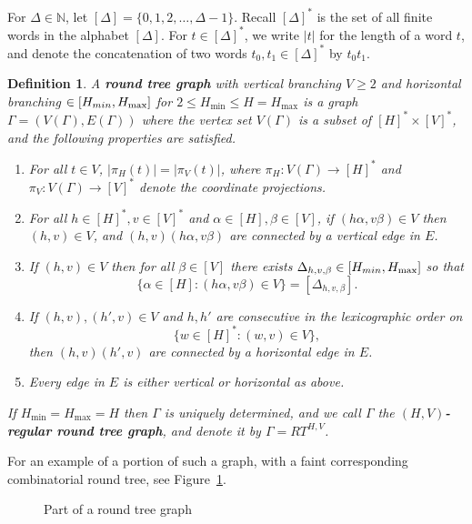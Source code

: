 \documentclass[11pt]{amsart}
\numberwithin{equation}{section}
\newtheorem{definition}[equation]{Definition}
\theoremstyle{citing}
\newcommand{\N}{\mathbb{N}}
\numberwithin{equation}{section}
\begin{document}
For $\Delta \in \N$, let $[\Delta] = \{0,1,2,\ldots,\Delta-1\}$.
Recall $[\Delta]^*$ is the set of all finite words in the alphabet $[\Delta]$.
For $t \in [\Delta]^*$, we write $|t|$ for the length of a word $t$, and denote the concatenation of two words $t_0,t_1 \in [\Delta]^*$ by $t_0t_1$.
\begin{definition}
	\label{def:round-tree-graph}
	A \textbf{round tree graph} with vertical branching $V \geq 2$ and horizontal branching $\in [H_{\\min},H_{\max}]$ for $2 \leq H_{\min} \leq H=H_{\max}$ is a graph $\Gamma=(V(\Gamma),E(\Gamma))$ where the vertex set $V(\Gamma)$ is a subset of $[H]^* \times [V]^*$, and the following properties are satisfied. 
	\begin{enumerate}
		\item For all $t \in V$, $|\pi_H(t)|=|\pi_V(t)|$, where $\pi_H:V(\Gamma) \to [H]^*$ and $\pi_V:V(\Gamma) \to [V]^*$ denote the coordinate projections.
		\item For all $h \in [H]^*, v \in [V]^*$ and $\alpha \in [H], \beta \in [V]$, if $(h\alpha,v\beta) \in V$ then $(h,v) \in V$, and $(h,v)(h\alpha,v\beta)$ are connected by a \emph{vertical} edge in $E$.
		\item If $(h,v) \in V$ then for all $\beta \in [V]$ there exists $\Delta_{h,v,\beta} \in [H_{\\min},H_{\max}]$ so that
			\[
				\{\alpha \in [H] : (h\alpha, v\beta) \in V\} = [\Delta_{h,v,\beta}].
			\]
		\item If $(h,v),(h',v) \in V$ and $h,h'$ are consecutive in the lexicographic order on
			\[ \{ w \in [H]^* : (w,v) \in V \}, \]
			then $(h,v)(h',v)$ are connected by a \emph{horizontal} edge in $E$.
		\item Every edge in $E$ is either vertical or horizontal as above.
	\end{enumerate}
	If $H_{\min}=H_{\max}=H$ then $\Gamma$ is uniquely determined, and we call $\Gamma$ the \textbf{$(H,V)$-regular round tree graph}, and denote it by $\Gamma=RT^{H,V}$.
\end{definition}
For an example of a portion of such a graph, with a faint corresponding combinatorial round tree, see Figure~\ref{fig:rtgraph}.
\begin{figure}
   \def\svgwidth{.8\textwidth}
   
	\caption{Part of a round tree graph}	
	\label{fig:rtgraph}
\end{figure}
\end{document}
